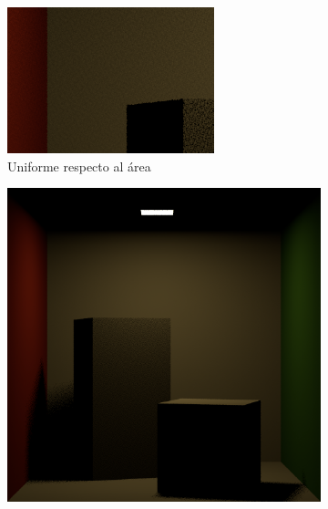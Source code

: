 \begin{figure}[h]
{\begin{minipage}{\dimexpr .5\textwidth-\fboxsep-2\fboxrule}
\begin{subfigure}{\textwidth}
            \includegraphics[width=\textwidth]{imagenes/rect12}
            \caption{Uniforme respecto al área}
            \end{subfigure}  
    \end{minipage}
    \hfill
\begin{minipage}{\dimexpr .5\textwidth-\fboxsep-2\fboxrule}
   \begin{subfigure}{\textwidth}
            \centering
            \includegraphics[width=\textwidth]{imagenes/rect2}
            \vspace{0.2cm}


\end{subfigure}
\end{minipage}}
\end{figure}
